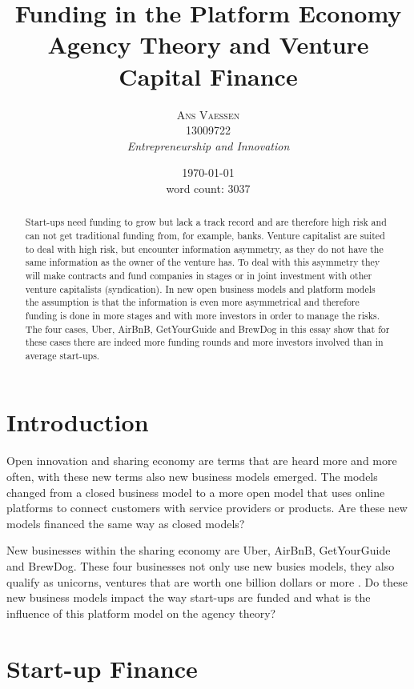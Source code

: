 \documentclass[a4paper, 11pt]{article}
\title{\textbf{Funding in the Platform Economy}\\Agency Theory and Venture Capital Finance}
\author{\textsc{Ans Vaessen}
\\13009722
\\{\textit{Entrepreneurship and Innovation}}}
\date{\today\\
word count: 3037}
\begin{document}
\maketitle

\begin{abstract}
Start-ups need funding to grow but lack a track record and are therefore high risk and can not get traditional funding from, for example, banks. Venture capitalist are suited to deal with high risk, but encounter information asymmetry, as they do not have the same information as the owner of the venture has. To deal with this asymmetry they will make contracts and fund companies in stages or in joint investment with other venture capitalists (syndication). In new open business models and platform models the assumption is that the information is even more asymmetrical and therefore funding is done in more stages and with more investors in order to manage the risks. The four cases, Uber, AirBnB, GetYourGuide and BrewDog in this essay show that for these cases there are indeed more funding rounds and more investors involved than in average start-ups. 
\end{abstract}



\vspace{30pt} %

\section*{Introduction}
Open innovation and sharing economy are terms that are heard more and more often, with these new terms also new business models emerged. The models changed from a closed business model to a more open model that uses online platforms to connect customers with service providers or products. Are these new models financed the same way as closed models?

New businesses within the sharing economy are Uber, AirBnB, GetYourGuide and BrewDog. 
These four businesses not only use new busies models, they also qualify as unicorns, ventures that are worth one billion dollars or more \citep{TiddBessant}. Do these new business models impact the way start-ups are funded and what is the influence of this platform model on the agency theory?

\section{Start-up Finance}
\end{document}

